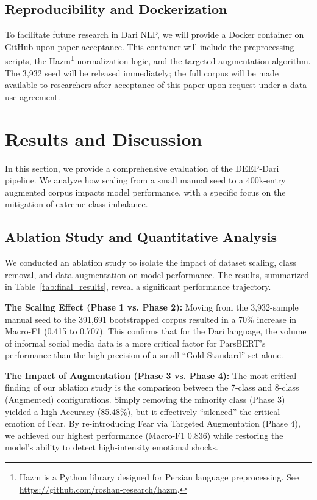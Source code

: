 \documentclass[runningheads]{llncs}
\begin{document}
\subsection{Reproducibility and Dockerization}
To facilitate future research in Dari NLP, we will provide a Docker container 
on GitHub upon paper acceptance. This container will include the preprocessing 
scripts, the Hazm\footnote{Hazm is a Python library designed for Persian language preprocessing. See \url{https://github.com/roshan-research/hazm}.} normalization logic, and the targeted augmentation algorithm. 
The 3,932 seed will be released immediately; the full corpus will be made 
available to researchers after acceptance of this paper  upon request under a data use agreement.
\section{Results and Discussion}
\label{sec:results}
In this section, we provide a comprehensive evaluation of the DEEP-Dari pipeline. We analyze how scaling from a small manual seed to a 400k-entry augmented corpus impacts model performance, with a specific focus on the mitigation of extreme class imbalance.

\subsection{Ablation Study and Quantitative Analysis}
We conducted an ablation study to isolate the impact of dataset scaling, class removal, and data augmentation on model performance. The results, summarized in Table~\ref{tab:final_results}, reveal a significant performance trajectory.

\textbf{The Scaling Effect (Phase 1 vs. Phase 2):} Moving from the 3,932-sample manual seed to the 391,691 bootstrapped corpus resulted in a 70\% increase in Macro-F1 (0.415 to 0.707). This confirms that for the Dari language, the volume of informal social media data is a more critical factor for ParsBERT's performance than the high precision of a small ``Gold Standard'' set alone.

\textbf{The Impact of Augmentation (Phase 3 vs. Phase 4):} The most critical finding of our ablation study is the comparison between the 7-class and 8-class (Augmented) configurations. Simply removing the minority class (Phase 3) yielded a high Accuracy (85.48\%), but it effectively ``silenced'' the critical emotion of Fear. By re-introducing Fear via Targeted Augmentation (Phase 4), we achieved our highest performance (Macro-F1 0.836) while restoring the model's ability to detect high-intensity emotional shocks.
\end{document}

